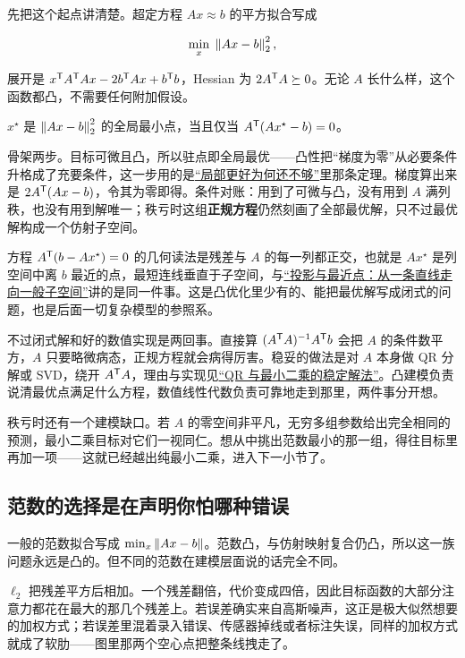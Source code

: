先把这个起点讲清楚。超定方程 \(Ax\approx b\) 的平方拟合写成

\[
\min_x\;\left\lVert Ax-b\right\rVert_2^2,
\]

展开是 \(x^{\mathsf{T}}A^{\mathsf{T}}Ax-2b^{\mathsf{T}}Ax+b^{\mathsf{T}}b\)，Hessian 为 \(2A^{\mathsf{T}}A\succeq0\)。无论 \(A\) 长什么样，这个函数都凸，不需要任何附加假设。

\begin{proposition}
\(x^\star\) 是 \(\left\lVert Ax-b\right\rVert_2^2\) 的全局最小点，当且仅当 \(A^{\mathsf{T}}(Ax^\star-b)=0\)。
\end{proposition}

骨架两步。目标可微且凸，所以驻点即全局最优——凸性把``梯度为零''从必要条件升格成了充要条件，这一步用的是\hyperref[sec:09-Convex-Optimization/01-Optimization-Foundations/02]{``局部更好为何还不够''}里那条定理。梯度算出来是 \(2A^{\mathsf{T}}(Ax-b)\)，令其为零即得。条件对账：用到了可微与凸，没有用到 \(A\) 满列秩，也没有用到解唯一；秩亏时这组\textbf{正规方程}仍然刻画了全部最优解，只不过最优解构成一个仿射子空间。

方程 \(A^{\mathsf{T}}(b-Ax^\star)=0\) 的几何读法是残差与 \(A\) 的每一列都正交，也就是 \(Ax^\star\) 是列空间中离 \(b\) 最近的点，最短连线垂直于子空间，与\hyperref[sec:03-Linear-Algebra/03-Orthogonality/02]{``投影与最近点：从一条直线走向一般子空间''}讲的是同一件事。这是凸优化里少有的、能把最优解写成闭式的问题，也是后面一切复杂模型的参照系。

不过闭式解和好的数值实现是两回事。直接算 \((A^{\mathsf{T}}A)^{-1}A^{\mathsf{T}}b\) 会把 \(A\) 的条件数平方，\(A\) 只要略微病态，正规方程就会病得厉害。稳妥的做法是对 \(A\) 本身做 QR 分解或 SVD，绕开 \(A^{\mathsf{T}}A\)，理由与实现见\hyperref[sec:08-Numerical-Analysis/05-Numerical-Linear-Algebra/02]{``QR 与最小二乘的稳定解法''}。凸建模负责说清最优点满足什么方程，数值线性代数负责可靠地走到那里，两件事分开想。

秩亏时还有一个建模缺口。若 \(A\) 的零空间非平凡，无穷多组参数给出完全相同的预测，最小二乘目标对它们一视同仁。想从中挑出范数最小的那一组，得往目标里再加一项——这就已经越出纯最小二乘，进入下一小节了。

\subsection{范数的选择是在声明你怕哪种错误}

一般的范数拟合写成 \(\min_x\left\lVert Ax-b\right\rVert\)。范数凸，与仿射映射复合仍凸，所以这一族问题永远是凸的。但不同的范数在建模层面说的话完全不同。

\(\ell_2\) 把残差平方后相加。一个残差翻倍，代价变成四倍，因此目标函数的大部分注意力都花在最大的那几个残差上。若误差确实来自高斯噪声，这正是极大似然想要的加权方式；若误差里混着录入错误、传感器掉线或者标注失误，同样的加权方式就成了软肋——图里那两个空心点把整条线拽走了。

